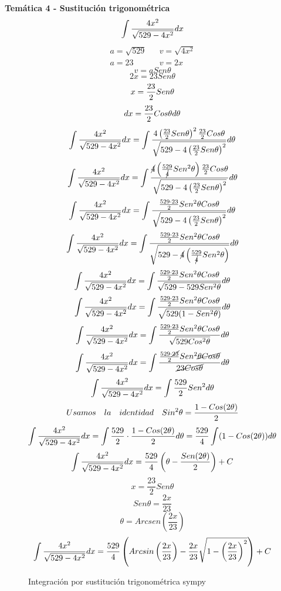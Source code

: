 





\textbf{Temática 4 - Sustitución trigonométrica}
\[\int\frac{4x^2}{\sqrt{529-4x^2}}dx\]
\[
    \begin{aligned}
        a=\sqrt{529} && v=\sqrt{4x^2} \\
        a=23 && v=2x
    \end{aligned}
\]
\[v=aSen\theta\]
\[2x=23Sen\theta\]
\[x=\frac{23}{2}Sen\theta\]
\[dx=\frac{23}{2}Cos\theta d\theta\]
\[\int\frac{4x^2}{\sqrt{529-4x^2}}dx=\int\frac{4\left(\frac{23}{2}Sen\theta\right)^2\frac{23}{2}Cos\theta}{\sqrt{529-4\left(\frac{23}{2}Sen\theta\right)^2}}d\theta\]
\[\int\frac{4x^2}{\sqrt{529-4x^2}}dx=\int\frac{\cancel{4}\left(\frac{529}{\cancel{4}}Sen^2\theta\right)\frac{23}{2}Cos\theta}{\sqrt{529-4\left(\frac{23}{2}Sen\theta\right)^2}}d\theta\]
\[\int\frac{4x^2}{\sqrt{529-4x^2}}dx=\int\frac{\frac{529\cdot23}{2}Sen^2\theta Cos\theta}{\sqrt{529-4\left(\frac{23}{2}Sen\theta\right)^2}}d\theta\]
\[\int\frac{4x^2}{\sqrt{529-4x^2}}dx=\int\frac{\frac{529\cdot23}{2}Sen^2\theta Cos\theta}{\sqrt{529-\cancel{4}\left(\frac{529}{\cancel{4}}Sen^2\theta\right)}}d\theta\]
\[\int\frac{4x^2}{\sqrt{529-4x^2}}dx=\int\frac{\frac{529\cdot23}{2}Sen^2\theta Cos\theta}{\sqrt{529-529Sen^2\theta}}d\theta\]
\[\int\frac{4x^2}{\sqrt{529-4x^2}}dx=\int\frac{\frac{529\cdot23}{2}Sen^2\theta Cos\theta}{\sqrt{529(1-Sen^2\theta)}}d\theta\]
\[\int\frac{4x^2}{\sqrt{529-4x^2}}dx=\int\frac{\frac{529\cdot23}{2}Sen^2\theta Cos\theta}{\sqrt{529Cos^2\theta}}d\theta\]
\[\int\frac{4x^2}{\sqrt{529-4x^2}}dx=\int\frac{\frac{529\cdot\cancel{23}}{2}Sen^2\cancel{\theta Cos\theta}}{\cancel{23Cos\theta}}d\theta\]
\[\int\frac{4x^2}{\sqrt{529-4x^2}}dx=\int\frac{529}{2}Sen^2d\theta\]
\[
    \begin{aligned}
        Usamos && la && identidad && Sin^2\theta=\frac{1-Cos(2\theta)}{2}
    \end{aligned}
\]
\[\int\frac{4x^2}{\sqrt{529-4x^2}}dx=\int\frac{529}{2}\cdot\frac{1-Cos(2\theta)}{2} d\theta=\frac{529}{4}\int(1-Cos(2\theta))d\theta\]
\[\int\frac{4x^2}{\sqrt{529-4x^2}}dx=\frac{529}{4}\left(\theta-\frac{Sen(2\theta)}{2}\right)+C\]
\[x=\frac{23}{2}Sen\theta\]
\[Sen\theta=\frac{2x}{23}\]
\[\theta=Arcsen\left(\frac{2x}{23}\right)\]
\[\int\frac{4x^2}{\sqrt{529-4x^2}}dx=\frac{529}{4}\left(Arcsin\left(\frac{2x}{23}\right)-\frac{2x}{23}\sqrt{1-\left(\frac{2x}{23}\right)^2}\right) + C
\]

\begin{figure}[h]
    \begin{center}
        \caption{Integración por sustitución trigonométrica sympy}
    \end{center}
\end{figure}